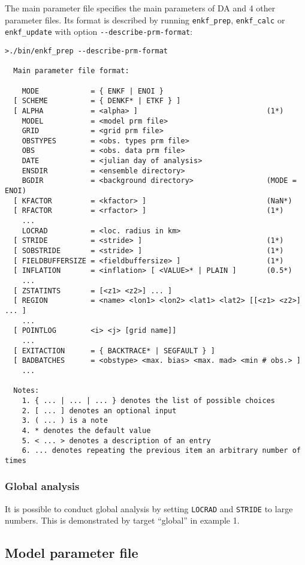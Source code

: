 \documentclass[11pt]{report}
\begin{document}
The main parameter file specifies the main parameters of DA and 4 other parameter files.
Its format is described by running \verb|enkf_prep|, \verb|enkf_calc| or \verb|enkf_update| with option \verb|--describe-prm-format|:
\begin{Verbatim}[frame=single,fontsize=\footnotesize]
>./bin/enkf_prep --describe-prm-format

  Main parameter file format:

    MODE            = { ENKF | ENOI }
  [ SCHEME          = { DENKF* | ETKF } ]
  [ ALPHA           = <alpha> ]                              (1*)
    MODEL           = <model prm file>
    GRID            = <grid prm file>
    OBSTYPES        = <obs. types prm file>
    OBS             = <obs. data prm file>
    DATE            = <julian day of analysis>
    ENSDIR          = <ensemble directory>
    BGDIR           = <background directory>                 (MODE = ENOI)
  [ KFACTOR         = <kfactor> ]                            (NaN*)
  [ RFACTOR         = <rfactor> ]                            (1*)
    ...
    LOCRAD          = <loc. radius in km>
  [ STRIDE          = <stride> ]                             (1*)
  [ SOBSTRIDE       = <stride> ]                             (1*)
  [ FIELDBUFFERSIZE = <fieldbuffersize> ]                    (1*)
  [ INFLATION       = <inflation> [ <VALUE>* | PLAIN ]       (0.5*)
    ...
  [ ZSTATINTS       = [<z1> <z2>] ... ]
  [ REGION          = <name> <lon1> <lon2> <lat1> <lat2> [[<z1> <z2>] ... ]
    ...
  [ POINTLOG        <i> <j> [grid name]]
    ...
  [ EXITACTION      = { BACKTRACE* | SEGFAULT } ]
  [ BADBATCHES      = <obstype> <max. bias> <max. mad> <min # obs.> ]
    ...

  Notes:
    1. { ... | ... | ... } denotes the list of possible choices
    2. [ ... ] denotes an optional input
    3. ( ... ) is a note
    4. * denotes the default value
    5. < ... > denotes a description of an entry
    6. ... denotes repeating the previous item an arbitrary number of times
\end{Verbatim}

\subsubsection{Global analysis}

It is possible to conduct global analysis by setting \verb|LOCRAD| and \verb|STRIDE| to large numbers.
This is demonstrated by target ``global'' in example 1.

\subsection{Model parameter file}
\label{sec:modelprm}
\end{document}
